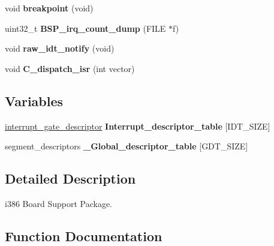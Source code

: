 \begin{DoxyCompactItemize}
\mbox{\label{group__RTEMSBSPsI386_gaef5ea7360080a589bedb934b57656cb9}} 
void {\bfseries breakpoint} (void)
\item 
\mbox{\label{group__RTEMSBSPsI386_gac6bae85cc504edaa0236d2ccc4e9db0a}} 
uint32\+\_\+t {\bfseries B\+S\+P\+\_\+irq\+\_\+count\+\_\+dump} (F\+I\+LE $\ast$f)
\item 
\mbox{\label{group__RTEMSBSPsI386_ga4497c4cbe3bdcc34eede2ed4bfa1cdd4}} 
void {\bfseries raw\+\_\+idt\+\_\+notify} (void)
\item 
\mbox{\label{group__RTEMSBSPsI386_gad5162adb0e614b760bc111cc5c0f554d}} 
void {\bfseries C\+\_\+dispatch\+\_\+isr} (int vector)
\end{DoxyCompactItemize}
\subsection*{Variables}
\begin{DoxyCompactItemize}
\item 
\mbox{\label{group__RTEMSBSPsI386_ga645d3fb58dfa518b5cdd623474f5a172}} 
\mbox{\hyperlink{structinterrupt__gate__descriptor}{interrupt\+\_\+gate\+\_\+descriptor}} {\bfseries Interrupt\+\_\+descriptor\+\_\+table} \mbox{[}I\+D\+T\+\_\+\+S\+I\+ZE\mbox{]}
\item 
\mbox{\label{group__RTEMSBSPsI386_gac3b953154c6e8b22ee8bcc2e098241af}} 
segment\+\_\+descriptors {\bfseries \+\_\+\+Global\+\_\+descriptor\+\_\+table} \mbox{[}G\+D\+T\+\_\+\+S\+I\+ZE\mbox{]}
\end{DoxyCompactItemize}


\subsection{Detailed Description}
i386 Board Support Package. 



\subsection{Function Documentation}
\mbox{\label{group__RTEMSBSPsI386_ga301be7085b80c41a9c5887247003c662}} 
